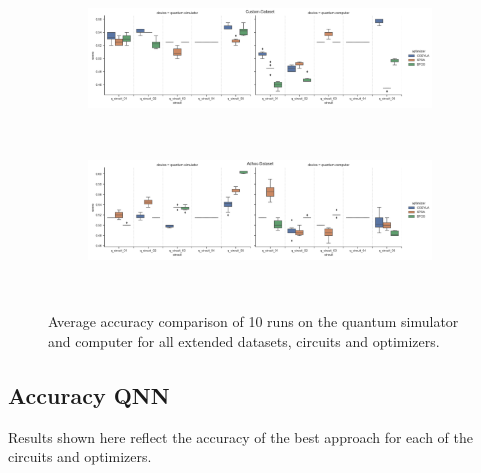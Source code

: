 \begin{figure}[!ht]
\begin{subfigure}{1.0\textwidth}
        \label{subfigure:accuracy_comparison_boxplots_vlds_extended_dataset}
    \end{subfigure}
    \\[-3ex]
    \begin{subfigure}{1.0\textwidth}
        \centering
        \includegraphics[width=1.0\linewidth]{thesis/Figures/qnn/boxplots/1000_custom.png}
        \label{subfigure:accuracy_comparison_boxplots_custom_extended_dataset}
    \end{subfigure}
    \\[-3ex]
    \begin{subfigure}{1.0\textwidth}
        \centering
        \includegraphics[width=1.0\linewidth]{thesis/Figures/qnn/boxplots/1000_adhoc.png}
        \label{subfigure:accuracy_comparison_boxplots_adhoc_extended_dataset}
    \end{subfigure}
    \\[-3ex]
    \caption{Average accuracy comparison of 10 runs on the quantum simulator and computer for all extended datasets, circuits and optimizers.}
    \label{figure:accuracy_comparison_boxplots_extended_datasets}
\end{figure}

\clearpage
\subsection{Accuracy QNN}
Results shown here reflect the accuracy of the best approach for each of the circuits and optimizers.

